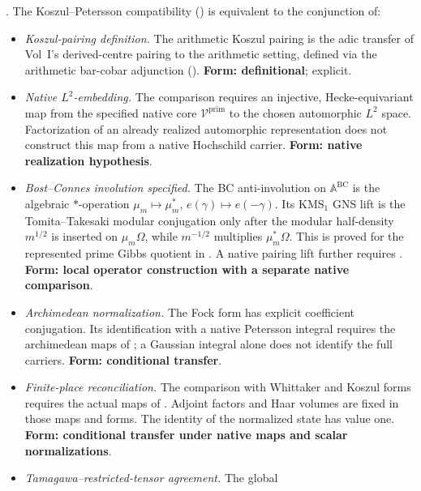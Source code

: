 \begin{theorem}
\label{v4-arith:sw:thm:KP-split}
\ClaimStatusProvedHere. The Koszul--Petersson compatibility
() is equivalent to
the conjunction of:
\begin{itemize}
\item[(K1)] \emph{Koszul-pairing definition.} The arithmetic Koszul
pairing is the adic transfer of Vol~I's derived-centre pairing to
the arithmetic setting, defined via the arithmetic bar-cobar
adjunction ().
\textbf{Form: definitional}; explicit.
\item[(K2)] \emph{Native \(L^2\)-embedding.} The comparison requires
an injective, Hecke-equivariant map from the specified native core
\(\mathcal V^{\mathrm{prim}}\) to the chosen automorphic \(L^2\)
space. Factorization of an already realized automorphic representation
does not construct this map from a native Hochschild carrier.
\textbf{Form: native realization hypothesis}.
\item[(K3)] \emph{Bost--Connes involution specified.} The BC
anti-involution on \(\mathbb{A}^{\mathrm{BC}}\) is the algebraic
\(*\)-operation \(\mu_m\mapsto\mu_m^{*}\), \(e(\gamma)\mapsto
e(-\gamma)\). Its KMS\({}_{1}\) GNS lift is the
Tomita--Takesaki modular conjugation only after the modular
half-density \(m^{1/2}\) is inserted on \(\mu_m\Omega\),
while \(m^{-1/2}\) multiplies \(\mu_m^*\Omega\). This is
proved for the represented prime Gibbs quotient in
. A native pairing lift further
requires .
\textbf{Form: local operator construction with a separate native comparison}.
\item[(K4)] \emph{Archimedean normalization.} The Fock form has
explicit coefficient conjugation. Its identification with a native
Petersson integral requires the archimedean maps of
; a Gaussian integral alone
does not identify the full carriers. \textbf{Form: conditional transfer}.
\item[(K5)] \emph{Finite-place reconciliation.} The comparison with
Whittaker and Koszul forms requires the actual maps of
. Adjoint factors
and Haar volumes are fixed in those maps and forms. The identity of the
normalized state has value one. \textbf{Form: conditional transfer
under native maps and scalar normalizations}.
\item[(K6)] \emph{Tamagawa--restricted-tensor agreement.} The global

\end{itemize}
\end{theorem}
